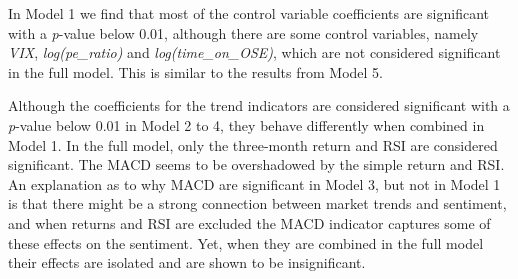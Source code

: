 In Model 1 we find that most of the control variable coefficients are significant with a \textit{p}-value below 0.01, although there are some control variables, namely \textit{VIX}, \textit{log(pe\_ratio)} and \textit{log(time\_on\_OSE)}, which are not considered significant in the full model. This is similar to the results from Model 5.

Although the coefficients for the trend indicators are considered significant with a \textit{p}-value below 0.01 in Model 2 to 4, they behave differently when combined in Model 1. In the full model, only the three-month return and RSI are considered significant. The MACD seems to be overshadowed by the simple return and RSI. An explanation as to why MACD are significant in Model 3, but not in Model 1 is that there might be a strong connection between market trends and sentiment, and when returns and RSI are excluded the MACD indicator captures some of these effects on the sentiment. Yet, when they are combined in the full model their effects are isolated and are shown to be insignificant. 


